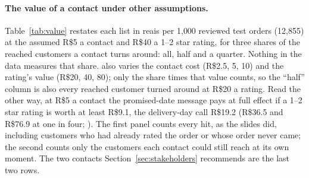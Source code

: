 \paragraph{The value of a contact under other assumptions.} Table~\ref{tab:value}
restates each list in reais per 1{,}000 reviewed test orders (12{,}855) at the
assumed R\$5 a contact and R\$40 a 1--2 star rating, for three shares of the
reached customers a contact turns around: all, half and a quarter. Nothing in
the data measures that share.  also varies
the contact cost (R\$2.5, 5, 10) and the rating's value (R\$20, 40, 80); only
the share times that value counts, so the ``half'' column is also every reached
customer turned around at R\$20 a rating. Read the other way, at R\$5 a contact
the promised-date message pays at full effect if a 1--2 star rating is worth at
least R\$9.1, the delivery-day call R\$19.2 (R\$36.5 and R\$76.9 at one in four;
). The
first panel counts every hit, as the slides did, including customers who had
already rated the order or whose order never came; the second counts only the
customers each contact could still reach at its own moment. The two contacts
Section~\ref{sec:stakeholders} recommends are the last two rows.

